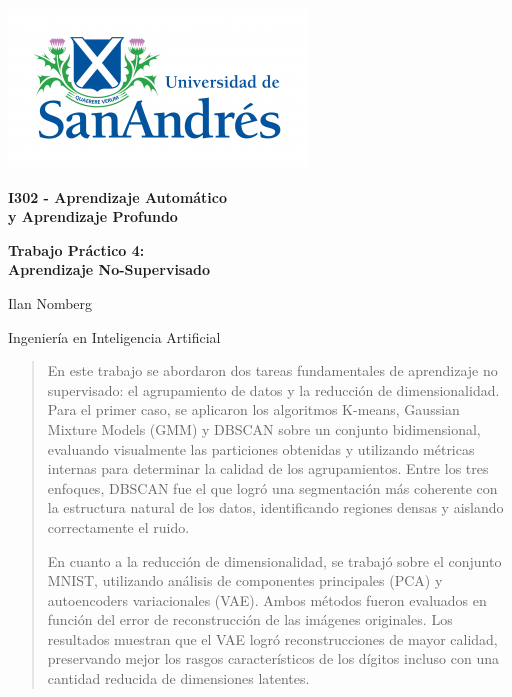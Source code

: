 \documentclass[11pt]{article}
\begin{document}
\begin{titlepage}
    \centering
    \vspace*{2cm}
    \includegraphics[scale=1.8]{figures/Logo-udesa.png}\par
    \vspace{10pt}

    {\LARGE \textbf{I302 - Aprendizaje Automático\\ y Aprendizaje Profundo}\par}
    \vspace{1cm}

    {\LARGE \textbf{Trabajo Práctico 4: \\Aprendizaje No-Supervisado}\par}
    \vspace{4cm}
    
    {\LARGE {Ilan Nomberg}\par {Ingeniería en Inteligencia Artificial}}  %
    \vspace{4cm}
    
    \vspace{1cm}
    \Large{}
    \date{}
\end{titlepage}

\begin{abstract}
En este trabajo se abordaron dos tareas fundamentales de aprendizaje no supervisado: el agrupamiento de datos y la reducción de dimensionalidad. Para el primer caso, se aplicaron los algoritmos K-means, Gaussian Mixture Models (GMM) y DBSCAN sobre un conjunto bidimensional, evaluando visualmente las particiones obtenidas y utilizando métricas internas para determinar la calidad de los agrupamientos. Entre los tres enfoques, DBSCAN fue el que logró una segmentación más coherente con la estructura natural de los datos, identificando regiones densas y aislando correctamente el ruido.

En cuanto a la reducción de dimensionalidad, se trabajó sobre el conjunto MNIST, utilizando análisis de componentes principales (PCA) y autoencoders variacionales (VAE). Ambos métodos fueron evaluados en función del error de reconstrucción de las imágenes originales. Los resultados muestran que el VAE logró reconstrucciones de mayor calidad, preservando mejor los rasgos característicos de los dígitos incluso con una cantidad reducida de dimensiones latentes.
\end{abstract}
\end{document}
